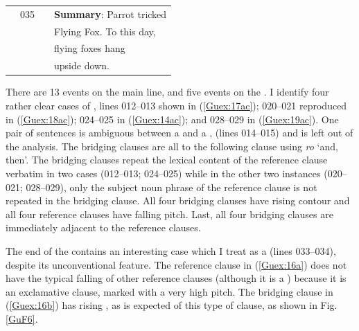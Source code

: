 \documentclass[output=paper]{LSP/langsci}
\begin{document}
\begin{table}[]
\begin{tabular}{llll}
                                               & 035               &                 & \textbf{Summary}:  Parrot tricked                     \\
                                                 &                   &                 & Flying Fox. To this day,                  \\
                                              &                   &                 &  flying foxes hang       \\
                                              &                   &                 &        upside   down.                  \\ 
\end{tabular}
\end{table}



There are 13 events on the main line, and five events on the . I identify four rather clear cases of , lines 012--013  shown in (\ref{Guex:17ac}); 020--021 reproduced in (\ref{Guex:18ac}); 024--025 in (\ref{Guex:14ac}); and 028--029 in (\ref{Guex:19ac}). One pair of sentences is ambiguous between a  and a , (lines 014--015) and is left out of the analysis.  The bridging clauses are all  to the following clause using \textit{ro} `and, then'.  The bridging clauses repeat the lexical content of the reference clause verbatim in two cases (012--013; 024--025) while in the other two instances (020--021; 028--029), only the subject noun phrase of the reference clause is not repeated in the bridging clause. All four bridging clauses have rising  contour and all four reference clauses have falling pitch. Last, all four bridging clauses are immediately adjacent to the reference clauses. 

The end of the  contains an interesting case which I treat as a  (lines 033--034), despite its unconventional feature. The reference clause in (\ref{Guex:16a}) does not have the typical falling  of other reference clauses (although it is a ) because it is  an exclamative clause, marked with a very high pitch. The bridging clause in (\ref{Guex:16b}) has rising , as is expected of this type of clause, as shown in Fig. \ref{GuF6}.
\end{document}
